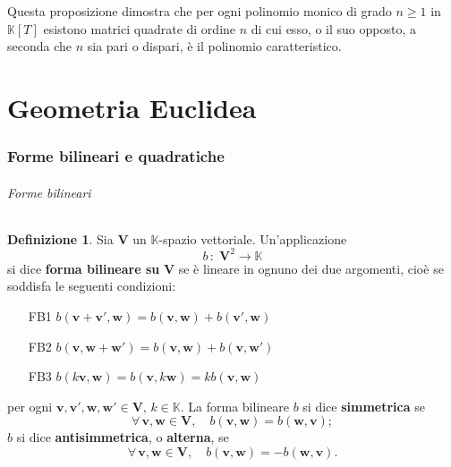 \documentclass{article}
\theoremstyle{plain}
\theoremstyle{definition}
\newtheorem{defn}{Definizione}[section]
\theoremstyle{remark}
\begin{document}
Questa proposizione dimostra che per ogni polinomio monico di grado $n \geq 1$ in $\mathbb{K}[T]$ esistono 
matrici quadrate di ordine $n$ di cui esso, o il suo opposto, a seconda che $n$ sia pari o dispari, è il 
polinomio caratteristico.

\vspace{50pt}
\part{Geometria Euclidea}
\vspace{50pt}

\section{Forme bilineari e quadratiche}
\vspace{20pt}

\paragraph{Forme bilineari}
\begin{bxthm}
\begin{defn}
Sia \( \mathbf{V} \) un \( \mathbb{K} \)-spazio vettoriale. Un'applicazione
\[
b \,:\; \mathbf{V}^2 \rightarrow \mathbb{K}
\]
si dice \textbf{forma bilineare su} \( \mathbf{V} \) se è lineare in ognuno dei due argomenti, cioè se soddisfa 
le seguenti condizioni:
\begin{itemize}
    \item[FB1] \( b(\mathbf{v} + \mathbf{v}', \mathbf{w}) = b(\mathbf{v}, \mathbf{w}) + b(\mathbf{v}', \mathbf{w}) \)
    \item[FB2] \( b(\mathbf{v}, \mathbf{w} + \mathbf{w}') = b(\mathbf{v}, \mathbf{w}) + b(\mathbf{v}, \mathbf{w}') \)
    \item[FB3] \( b(k\mathbf{v}, \mathbf{w}) = b(\mathbf{v}, k\mathbf{w}) = kb(\mathbf{v}, \mathbf{w}) \)
\end{itemize}
per ogni \( \mathbf{v}, \mathbf{v}', \mathbf{w}, \mathbf{w}' \in \mathbf{V},\, k \in \mathbb{K} \).
La forma bilineare \( b \) si dice \textbf{simmetrica} se
\[
\forall\,\mathbf{v}, \mathbf{w} \in \mathbf{V},\quad b(\mathbf{v}, \mathbf{w}) = b(\mathbf{w}, \mathbf{v}) ;
\]
\( b \) si dice \textbf{antisimmetrica}, o \textbf{alterna}, se
\[
\forall\,\mathbf{v}, \mathbf{w} \in \mathbf{V},\quad b(\mathbf{v}, \mathbf{w}) = -b(\mathbf{w}, \mathbf{v}) .
\]
\end{defn}
\end{bxthm}
\end{document}
